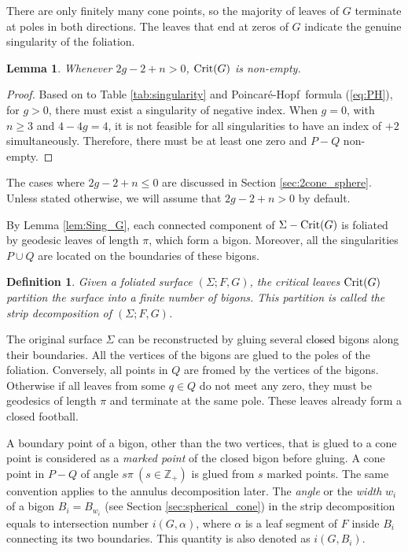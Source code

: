\documentclass[pdflatex,sn-mathphys]{sn-jnl}%
\numberwithin{equation}{section}
\theoremstyle{thmstyleone}%
\newtheorem{definition}[theorem]{Definition}
\newtheorem{lemma}[theorem]{Lemma}
\newcommand{\ZZ}{\mathbb{Z}}
\newcommand{\PH}{Poincar\'{e}-Hopf}
\newcommand{\DEF}{\emph}
\newcommand{\EMP}{\textcolor{black}}
\begin{document}
There are only finitely many cone points, so the majority of leaves of $G$ terminate at poles in both directions. The leaves that end at zeros of 
$G$ indicate the genuine singularity of the foliation.

\begin{lemma}
    Whenever $2g-2+n>0$, $\mathrm{Crit}(G)$ is non-empty.
\end{lemma}
\begin{proof}
    Based on to Table \ref{tab:singularity} and \PH\ formula (\ref{eq:PH}), for $g>0$, there must exist a singularity of negative index. When $g=0$, with $n\geq3$ and $4-4g=4$, it is not feasible for all singularities to have an index of $+2$ simultaneously. Therefore, there must be at least one zero and $P-Q$ non-empty.
\end{proof}

The cases where $2g-2+n\leq0$ are discussed in Section \ref{sec:2cone_sphere}. Unless stated otherwise, we will assume that $2g-2+n>0$ by default.

By Lemma \ref{lem:Sing_G}, each connected component of $\Sigma-\mathrm{Crit}(G)$ is foliated by geodesic leaves of length $\pi$, which form a bigon. Moreover, all the singularities $P\cup Q$ are located on the boundaries of these bigons.

\begin{definition}\label{def:strip_decomp}
    Given a foliated surface $(\Sigma;F,G)$, the critical leaves $\mathrm{Crit}(G)$ partition the surface into a finite number of bigons. This partition is called the \DEF{strip decomposition} of $(\Sigma;F,G)$.
\end{definition}

The original surface $\Sigma$ can be reconstructed by gluing several \EMP{closed} bigons along their boundaries. %
All the vertices of the bigons are glued to the poles of the foliation. Conversely, all points in $Q$ are fromed by the vertices of the bigons. Otherwise if all leaves from some $q\in Q$ do not meet any zero, they must be geodesics of length $\pi$ and terminate at the same pole. These leaves already form a closed football.

A boundary point of a bigon, other than the two vertices, that is glued to a cone point is considered as a \DEF{marked point} of the closed bigon before gluing. %
A cone point in $P-Q$ of angle $s\pi\ (s\in\ZZ_+)$ is glued from $s$ marked points. %
The same convention applies to the annulus decomposition later. 
The \DEF{angle} or the \DEF{width} $w_i$ of a bigon $B_i=B_{w_i}$ (see Section \ref{sec:spherical_cone}) in the strip decomposition equals to intersection number $i(G,\alpha)$, where $\alpha$ is a leaf segment of $F$ inside $B_i$ connecting its two boundaries. This quantity is also denoted as $i(G, B_i)$.
\end{document}
